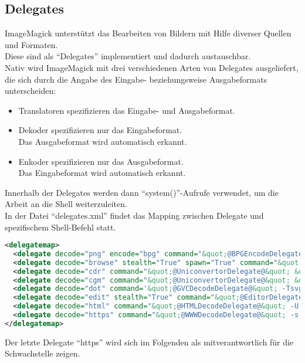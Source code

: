 \newpage
\subsection{Delegates}\label{subsec:delegates}

ImageMagick unterstützt das Bearbeiten von Bildern mit Hilfe diverser Quellen und Formaten.\\
Diese sind als "`Delegates"' implementiert und dadurch austauschbar.\\

Nativ wird ImageMagick mit drei verschiedenen Arten von Delegates ausgeliefert, die sich durch die Angabe des Eingabe- beziehungsweise Ausgabeformats unterscheiden:
\begin{itemize}
    \item Translatoren spezifizieren das Eingabe- und Ausgabeformat.
    \item Dekoder spezifizieren nur das Eingabeformat.\\
    Das Ausgabeformat wird automatisch erkannt.
    \item Enkoder spezifizieren nur das Ausgabeformat.\\
    Das Eingabeformat wird automatisch erkannt.
\end{itemize}

Innerhalb der Delegates werden dann "`system()"'-Aufrufe verwendet, um die Arbeit an die Shell weiterzuleiten.\\

In der Datei "`delegates.xml"' findet das Mapping zwischen Delegate und spezifischem Shell-Befehl statt.\\

\begin{lstlisting}[language=XML, caption=/config/delegates.xml.in Auszug,label={lst:lstlisting}]
<delegatemap>
  <delegate decode="png" encode="bpg" command="&quot;@BPGEncodeDelegate@&quot; -b 12 -q %[fx:quality/2] -o &quot;%o&quot; &quot;%i&quot;"/>
  <delegate decode="browse" stealth="True" spawn="True" command="&quot;@BrowseDelegate@&quot; http://www.imagemagick.org/; rm &quot;%i&quot;"/>
  <delegate decode="cdr" command="&quot;@UniconvertorDelegate@&quot; &quot;%i&quot; &quot;%o.svg&quot;; mv &quot;%o.svg&quot; &quot;%o&quot;"/>
  <delegate decode="cgm" command="&quot;@UniconvertorDelegate@&quot; &quot;%i&quot; &quot;%o.svg&quot;; mv &quot;%o.svg&quot; &quot;%o&quot;"/>
  <delegate decode="dot" command='&quot;@GVCDecodeDelegate@&quot; -Tsvg &quot;%i&quot; -o &quot;%o&quot;' />
  <delegate decode="edit" stealth="True" command="&quot;@EditorDelegate@&quot; -title &quot;Edit Image Comment&quot; -e vi &quot;%o&quot;"/>
  <delegate decode="html" command="&quot;@HTMLDecodeDelegate@&quot; -U -o &quot;%o&quot; &quot;%i&quot;"/>
  <delegate decode="https" command="&quot;@WWWDecodeDelegate@&quot; -s -k -L -o &quot;%o&quot; &quot;https:%M&quot;"/>
</delegatemap>
\end{lstlisting}
\vspace{5mm}

Der letzte Delegate "`https"' wird sich im Folgenden als mitverantwortlich für die Schwachstelle zeigen.